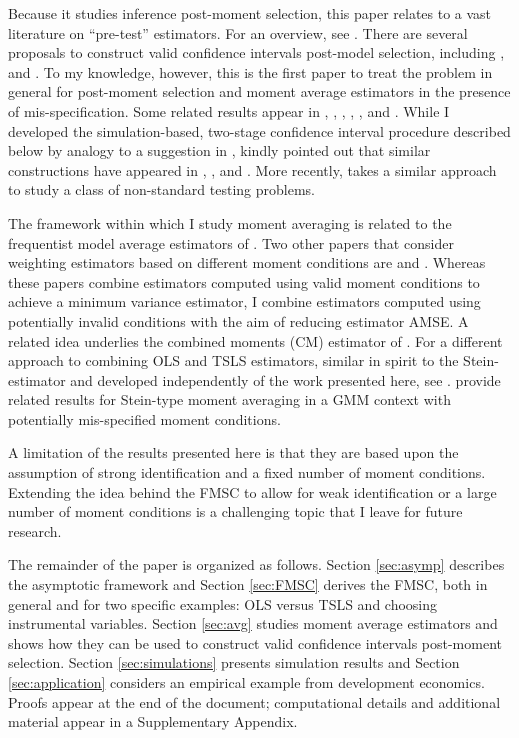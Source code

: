Because it studies inference post-moment selection, this paper relates to a vast literature on ``pre-test'' estimators.
For an overview, see \citet{LeebPoetscher2005, LeebPoetscher2009}.
There are several proposals to construct valid confidence intervals post-model selection, including \cite{Kabaila1998}, \cite{HjortClaeskens} and \cite{KabailaLeeb2006}. 
To my knowledge, however, this is the first paper to treat the problem in general for post-moment selection and moment average estimators in the presence of mis-specification.
Some related results appear in \cite{Berkowitz2008}, \cite{Berkowitz2012}, \cite{Guggenberger2010}, \cite{Guggenberger2012}, \cite{GuggenbergerKumar}, and \cite{Caner2014}.
While I developed the simulation-based, two-stage confidence interval procedure described below by analogy to a suggestion in \cite{ClaeskensHjortbook}, \cite{Leeb} kindly pointed out that similar constructions have appeared in \cite{Loh1985}, \cite{Berger1994}, and \cite{Silvapulle1996}. More recently, \cite{McCloskey} takes a similar approach to study a class of non-standard testing problems.

The framework within which I study moment averaging is related to the frequentist model average estimators of \cite{HjortClaeskens}.
Two other papers that consider weighting estimators based on different moment conditions are \cite{Xiao} and \cite{ChenChavezLinton}.
Whereas these papers combine estimators computed using valid moment conditions to achieve a minimum variance estimator, I combine estimators computed using potentially invalid conditions with the aim of reducing estimator AMSE.
A related idea underlies the combined moments (CM) estimator of \cite{Judge2007}.
For a different approach to combining OLS and TSLS estimators, similar in spirit to the Stein-estimator and developed independently of the work presented here, see \cite{HansenStein}. 
\cite{ChengLiaoShi} provide related results for Stein-type moment averaging in a GMM context with potentially mis-specified moment conditions.

A limitation of the results presented here is that they are based upon the assumption of strong identification and a fixed number of moment conditions.
Extending the idea behind the FMSC to allow for weak identification or a large number of moment conditions is a challenging topic that I leave for future research.


The remainder of the paper is organized as follows.
Section \ref{sec:asymp} describes the asymptotic framework and Section \ref{sec:FMSC} derives the FMSC, both in general and for two specific examples: OLS versus TSLS and choosing instrumental variables.
Section \ref{sec:avg} studies moment average estimators and shows how they can be used to construct valid confidence intervals post-moment selection.
Section \ref{sec:simulations} presents simulation results and Section \ref{sec:application} considers an empirical example from development economics.
Proofs appear at the end of the document; computational details and additional material appear in a Supplementary Appendix. 
